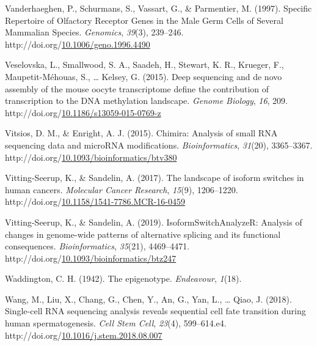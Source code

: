 \documentclass[12pt,twoside]{reedthesis}
\newlength{\cslhangindent}
\newenvironment{CSLReferences}[2] %
 {%
  \setlength{\parindent}{0pt}
  \ifodd #1 \everypar{\setlength{\hangindent}{\cslhangindent}}\ignorespaces\fi
  \ifnum #2 > 0
  \setlength{\parskip}{#2\baselineskip}
  \fi
 }%
 {}
\begin{document}
\begin{CSLReferences}{1}{0}
\leavevmode{}%
Vanderhaeghen, P., Schurmans, S., Vassart, G., \& Parmentier, M. (1997). Specific Repertoire of Olfactory Receptor Genes in the Male Germ Cells of Several Mammalian Species. \emph{Genomics}, \emph{39}(3), 239--246. http://doi.org/\href{https://doi.org/10.1006/geno.1996.4490}{10.1006/geno.1996.4490}

\leavevmode{}%
Veselovska, L., Smallwood, S. A., Saadeh, H., Stewart, K. R., Krueger, F., Maupetit-Méhouas, S., \ldots{} Kelsey, G. (2015). Deep sequencing and de novo assembly of the mouse oocyte transcriptome define the contribution of transcription to the DNA methylation landscape. \emph{Genome Biology}, \emph{16}, 209. http://doi.org/\href{https://doi.org/10.1186/s13059-015-0769-z}{10.1186/s13059-015-0769-z}

\leavevmode{}%
Vitsios, D. M., \& Enright, A. J. (2015). Chimira: Analysis of small RNA sequencing data and microRNA modifications. \emph{Bioinformatics}, \emph{31}(20), 3365--3367. http://doi.org/\href{https://doi.org/10.1093/bioinformatics/btv380}{10.1093/bioinformatics/btv380}

\leavevmode{}%
Vitting-Seerup, K., \& Sandelin, A. (2017). The landscape of isoform switches in human cancers. \emph{Molecular Cancer Research}, \emph{15}(9), 1206--1220. http://doi.org/\href{https://doi.org/10.1158/1541-7786.MCR-16-0459}{10.1158/1541-7786.MCR-16-0459}

\leavevmode{}%
Vitting-Seerup, K., \& Sandelin, A. (2019). IsoformSwitchAnalyzeR: Analysis of changes in genome-wide patterns of alternative splicing and its functional consequences. \emph{Bioinformatics}, \emph{35}(21), 4469--4471. http://doi.org/\href{https://doi.org/10.1093/bioinformatics/btz247}{10.1093/bioinformatics/btz247}

\leavevmode{}%
Waddington, C. H. (1942). The epigenotype. \emph{Endeavour}, \emph{1}(18).

\leavevmode{}%
Wang, M., Liu, X., Chang, G., Chen, Y., An, G., Yan, L., \ldots{} Qiao, J. (2018). Single-cell RNA sequencing analysis reveals sequential cell fate transition during human spermatogenesis. \emph{Cell Stem Cell}, \emph{23}(4), 599--614.e4. http://doi.org/\href{https://doi.org/10.1016/j.stem.2018.08.007}{10.1016/j.stem.2018.08.007}


\end{CSLReferences}
\end{document}
